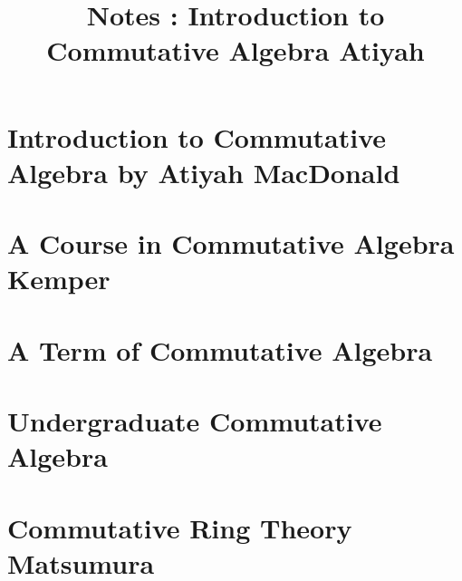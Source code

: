 \documentclass{article}
\title{Notes : Introduction to Commutative Algebra Atiyah}
\begin{document}
\tableofcontents
{}
\newpage\part{Introduction to Commutative Algebra by Atiyah MacDonald}
\newpage\part{A Course in Commutative Algebra Kemper}
\newpage\part{A Term of Commutative Algebra}
\newpage\part{Undergraduate Commutative Algebra}
\newpage\part{Commutative Ring Theory Matsumura}

\newpage

\end{document}
